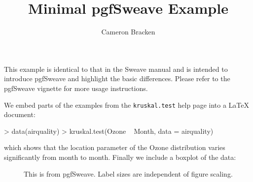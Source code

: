 \documentclass{article}
\title{Minimal pgfSweave Example}
\author{Cameron Bracken}
\begin{document}
\maketitle
This example is identical to that in the Sweave manual and is intended to
introduce pgfSweave and highlight the basic differences.  Please refer to
the pgfSweave vignette for more usage instructions.

We embed parts of the examples from the \texttt{kruskal.test} help page
into a \LaTeX{} document:

\begin{Schunk}
\begin{Sinput}
> data(airquality)
> kruskal.test(Ozone ~ Month, data = airquality)
\end{Sinput}
\end{Schunk}
which shows that the location parameter of the Ozone distribution varies
significantly from month to month. Finally we include a boxplot of the data:


\begin{figure}[!ht]
\centering
{}

\endpgfgraphicnamed
\caption{This is from pgfSweave. Label sizes are independent of figure scaling.}
\end{figure}
\end{document}
